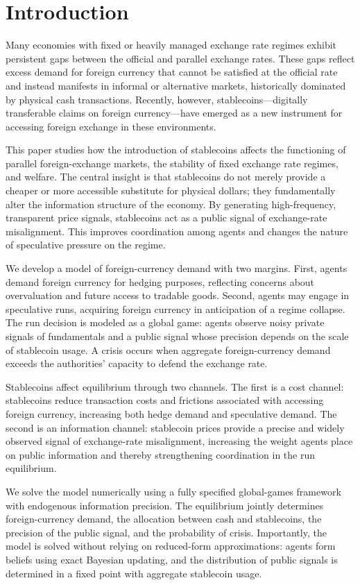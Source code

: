 \section{Introduction}

Many economies with fixed or heavily managed exchange rate regimes exhibit persistent gaps between the official and parallel exchange rates. These gaps reflect excess demand for foreign currency that cannot be satisfied at the official rate and instead manifests in informal or alternative markets, historically dominated by physical cash transactions. Recently, however, stablecoins---digitally transferable claims on foreign currency---have emerged as a new instrument for accessing foreign exchange in these environments.

This paper studies how the introduction of stablecoins affects the functioning of parallel foreign-exchange markets, the stability of fixed exchange rate regimes, and welfare. The central insight is that stablecoins do not merely provide a cheaper or more accessible substitute for physical dollars; they fundamentally alter the information structure of the economy. By generating high-frequency, transparent price signals, stablecoins act as a public signal of exchange-rate misalignment. This improves coordination among agents and changes the nature of speculative pressure on the regime.

We develop a model of foreign-currency demand with two margins. First, agents demand foreign currency for hedging purposes, reflecting concerns about overvaluation and future access to tradable goods. Second, agents may engage in speculative runs, acquiring foreign currency in anticipation of a regime collapse. The run decision is modeled as a global game: agents observe noisy private signals of fundamentals and a public signal whose precision depends on the scale of stablecoin usage. A crisis occurs when aggregate foreign-currency demand exceeds the authorities' capacity to defend the exchange rate.

Stablecoins affect equilibrium through two channels. The first is a cost channel: stablecoins reduce transaction costs and frictions associated with accessing foreign currency, increasing both hedge demand and speculative demand. The second is an information channel: stablecoin prices provide a precise and widely observed signal of exchange-rate misalignment, increasing the weight agents place on public information and thereby strengthening coordination in the run equilibrium.

We solve the model numerically using a fully specified global-games framework with endogenous information precision. The equilibrium jointly determines foreign-currency demand, the allocation between cash and stablecoins, the precision of the public signal, and the probability of crisis. Importantly, the model is solved without relying on reduced-form approximations: agents form beliefs using exact Bayesian updating, and the distribution of public signals is determined in a fixed point with aggregate stablecoin usage.

